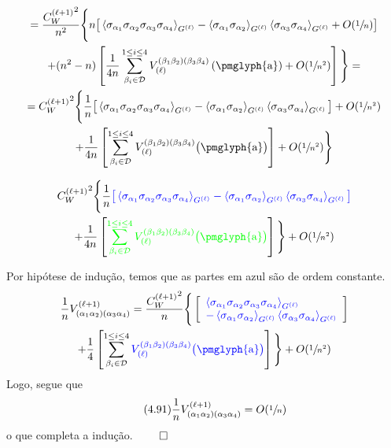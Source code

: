 \documentclass{beamer}
\newcommand{\Dcal}{\mathcal{D}}
\def\mi#1{{\alpha_{#1}}}
\def\mj#1{\beta_{#1}}
\def\eell{{(\ell)}}
\def\eellum{{(\ell+1)}}
\newcommand{\Vertice}[5]{V^{(#1)}_{(\mi#2\mi#3)(\mi#4\mi#5)}}
\newcommand{\Verticeinvb}[5]{V_{(#1)}^{(\mj#2\mj#3)(\mj#4\mj#5)}}
\newcommand{\Expectation}[2]{\left\langle #1 \right\rangle_{#2}}
\begin{document}
\begin{frame} 
	\small
	\begin{multline*}
		= \frac{{C_W^\eellum}^2}{n^2} \Bigg\{n\big[\Expectation{\sigma_\mi1\sigma_\mi2\sigma_\mi3\sigma_\mi4}{G^\eell} - \Expectation{\sigma_\mi1\sigma_\mi2}{G^\eell}  \Expectation{\sigma_\mi3\sigma_\mi4}{G^\eell}  +  O(\sfrac{1}{n}) \big] \\ 
		+(n^2-n)\left[\frac{1}{4n}\sum_{\mj{i}\in\Dcal}^{1\le{i}\le4}\Verticeinvb{\ell}1234\left(\text{\pmglyph{a}}\right) + O(\sfrac{1}{n^2})\right]\Bigg\} =\\
		= {{C_W^\eellum}^2} \Bigg\{ \frac{1}{n}\big[\Expectation{\sigma_\mi1\sigma_\mi2\sigma_\mi3\sigma_\mi4}{G^\eell} - \Expectation{\sigma_\mi1\sigma_\mi2}{G^\eell}  \Expectation{\sigma_\mi3\sigma_\mi4}{G^\eell} \big]  +  O(\sfrac{1}{n^2})\\
		+ \frac{1}{4n}\left[\sum_{\mj{i}\in\Dcal}^{1\le{i}\le4}\Verticeinvb{\ell}1234\big(\text{\pmglyph{a}}\big)\right] + O(\sfrac{1}{n^2})\Bigg\}
	\end{multline*}
	
\end{frame}

\begin{frame}
	\small
	\begin{multline*}
		 {{C_W^\eellum}^2} \Bigg\{ \frac{1}{n} {\color{blue}
		 \big[\Expectation{\sigma_\mi1\sigma_\mi2\sigma_\mi3\sigma_\mi4}{G^\eell} - \Expectation{\sigma_\mi1\sigma_\mi2}{G^\eell}  \Expectation{\sigma_\mi3\sigma_\mi4}{G^\eell} \big] }  \\
		+ \frac{1}{4n}\left[ {\color{green}\sum_{\mj{i}\in\Dcal}^{1\le{i}\le4}\Verticeinvb{\ell}1234\big(\text{\pmglyph{a}}\big) }\right] \Bigg\} + O(\sfrac{1}{n^2})
	\end{multline*}
	
\end{frame}

\begin{frame}
	Por hipótese de indução, temos que as partes em azul são de ordem constante.
	{\small
	\begin{multline*}
		 \frac{1}{n}\Vertice{\ell+1}1234 = \frac{{C_W^\eellum}^2}{n} \Bigg\{  
		 \left[{\color{blue} \begin{array}{l}
		 \Expectation{\sigma_\mi1\sigma_\mi2\sigma_\mi3\sigma_\mi4}{G^\eell} \\
		 - \Expectation{\sigma_\mi1\sigma_\mi2}{G^\eell}  \Expectation{\sigma_\mi3\sigma_\mi4}{G^\eell} 
		 \end{array} }
\right]   \\
		+ \frac{1}{4}\left[ \sum_{\mj{i}\in\Dcal}^{1\le{i}\le4}{\color{blue}\Verticeinvb{\ell}1234\big(\text{\pmglyph{a}}\big) }\right] \Bigg\} + O(\sfrac{1}{n^2})
	\end{multline*}
	}
	Logo, segue que 
	\begin{equation*}\tag{4.91}
		\frac{1}{n}\Vertice{\ell+1}1234 = O(\sfrac{1}{n}) 
	\end{equation*}
	o que completa a indução. \hfill $\qed$ 
\end{frame}
\end{document}
